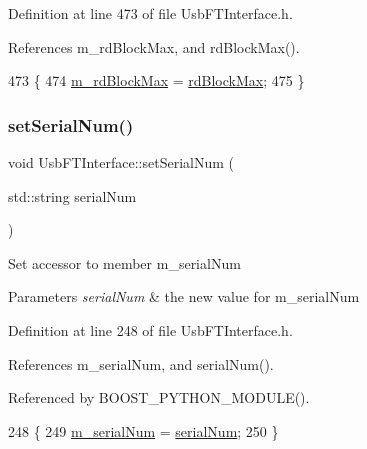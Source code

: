 Definition at line 473 of file Usb\+F\+T\+Interface.\+h.



References m\+\_\+rd\+Block\+Max, and rd\+Block\+Max().


\begin{DoxyCode}
473                                        \{
474     \hyperlink{classUsbFTInterface_a0f5050f1ed93392c8e5e4acaf7b75e1c}{m\_rdBlockMax} = \hyperlink{classUsbFTInterface_a9f213ab1804e61af476bbdd3ade2d053}{rdBlockMax};
475   \}
\end{DoxyCode}
\mbox{\label{classUsbFTInterface_aaabe44c3b717a98e7571de296085c3a4}} 
\subsubsection{\texorpdfstring{set\+Serial\+Num()}{setSerialNum()}}
{\footnotesize\ttfamily void Usb\+F\+T\+Interface\+::set\+Serial\+Num (\begin{DoxyParamCaption}\item[{std\+::string}]{serial\+Num }\end{DoxyParamCaption})\hspace{0.3cm}{\ttfamily [inline]}}

Set accessor to member m\+\_\+serial\+Num 
\begin{DoxyParams}{Parameters}
{\em serial\+Num} & the new value for m\+\_\+serial\+Num \\
\hline
\end{DoxyParams}


Definition at line 248 of file Usb\+F\+T\+Interface.\+h.



References m\+\_\+serial\+Num, and serial\+Num().



Referenced by B\+O\+O\+S\+T\+\_\+\+P\+Y\+T\+H\+O\+N\+\_\+\+M\+O\+D\+U\+L\+E().


\begin{DoxyCode}
248                                           \{
249     \hyperlink{classUsbFTInterface_a031610ca38939734ec7431d80f5f299f}{m\_serialNum} = \hyperlink{classUsbFTInterface_ab4a2aa9664e903c57ae396faf643e7a3}{serialNum};
250   \}
\end{DoxyCode}
\mbox{\label{classUsbFTInterface_aff0c9289dfd34e05e472f2f115f78a01}} 
